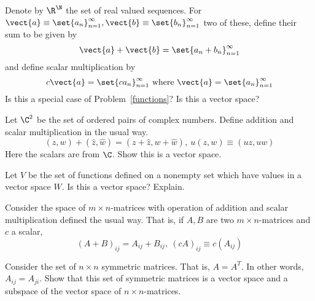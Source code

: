 \begin{ex} Denote by $\R^{\N}$ the set of real valued sequences.
For $\vect{a}\equiv \set{a_{n}} _{n=1}^{\infty },\vect{b}\equiv
\set{b_{n}} _{n=1}^{\infty }$ two of these, define their sum to be
given by
\begin{equation*}
\vect{a}+\vect{b} =  \set{a_{n}+b_{n}} _{n=1}^{\infty }
\end{equation*}
and define scalar multiplication by
\begin{equation*}
c\vect{a}=\set{ca_{n}} _{n=1}^{\infty }\text{ where }\vect{a}
=\set{a_{n}} _{n=1}^{\infty }
\end{equation*}
Is this a special case of Problem~\ref{functions}? Is this a vector space?
\end{ex}

\begin{ex} Let $\C^{2}$ be the set of ordered pairs of complex numbers.
Define addition and scalar multiplication in the usual way.
\begin{equation*}
(z,w) +(\hat{z},\hat{w}) = (z+\hat{z},w+
\hat{w}) ,\ u(z,w) \equiv (uz,uw)
\end{equation*}
Here the scalars are from $\C$. Show this is a vector space.
\end{ex}

\begin{ex} Let $V$ be the set of functions defined on a nonempty set which have
values in a vector space $W$. Is this a vector space? Explain.
\end{ex}

\begin{ex} Consider the space of $m\times n$-matrices with operation of addition
and scalar multiplication defined the usual way. That is, if $A,B$ are two $
m\times n$-matrices and $c$ a scalar,
\begin{equation*}
(A+B) _{ij}=A_{ij}+B_{ij},\ (cA) _{ij}\equiv c(
A_{ij})
\end{equation*}
\end{ex}

\begin{ex} Consider the set of $n\times n$ symmetric matrices. That is, $A=A^{T}$.
In other words, $A_{ij}=A_{ji}$. Show that this set of symmetric matrices is
a vector space and a subspace of the vector space of $n\times n$-matrices.
\end{ex}

